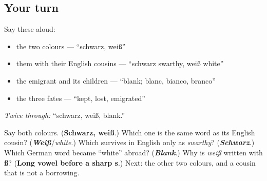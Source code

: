 \subsection*{Your turn}
Say these aloud:

\begin{itemize}
\raggedright
  \item the two colours — \textquotedblleft{}schwarz, weiß\textquotedblright{}
  \item them with their English cousins — \textquotedblleft{}schwarz swarthy, weiß white\textquotedblright{}
  \item the emigrant and its children — \textquotedblleft{}blank; blanc, bianco, branco\textquotedblright{}
  \item the three fates — \textquotedblleft{}kept, lost, emigrated\textquotedblright{}
\end{itemize}

\emph{Twice through:} \textquotedblleft{}schwarz, weiß, blank.\textquotedblright{}

\begin{tcolorbox}[breakable,colback=teal!4,colframe=teal!35!black,title={Before you move on}]
Say both colours. (\textbf{Schwarz, weiß}.) Which one is the same word as its English cousin? (\emph{\textbf{Weiß}}/\emph{white}.) Which survives in English only as \emph{swarthy}? (\emph{\textbf{Schwarz}}.) Which German word became \textquotedblleft{}white\textquotedblright{} abroad? (\emph{\textbf{Blank}}.) Why is \emph{weiß} written with \textbf{ß}? (\textbf{Long vowel before a sharp s}.) Next: the other two colours, and a cousin that is not a borrowing.
\end{tcolorbox}
